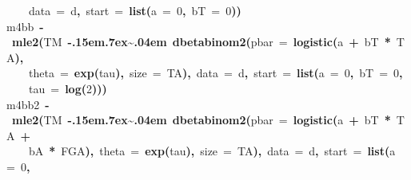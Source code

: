 \documentclass{article}
\makeatletter
\newcommand{\hlnumber}[1]{\textcolor[rgb]{0,0,0}{#1}}%
\newcommand{\hlfunctioncall}[1]{\textcolor[rgb]{.5,0,.33}{\textbf{#1}}}%
\newcommand{\hlkeyword}[1]{\textbf{#1}}%
\newcommand{\hlargument}[1]{\textcolor[rgb]{.69,.25,.02}{#1}}%
\newcommand{\hlassignement}[1]{\textbf{#1}}%
\newcommand{\hlsymbol}[1]{#1}%
\def\urltilda{\kern -.15em\lower .7ex\hbox{\~{}}\kern .04em}%
\newcommand{\hlstd}[1]{\textcolor[rgb]{0,0,0}{#1}}%
\newenvironment{kframe}{%
 \def\FrameCommand##1{\hskip\@totalleftmargin \hskip-\fboxsep
 \colorbox{shadecolor}{##1}\hskip-\fboxsep
     \hskip-\linewidth \hskip-\@totalleftmargin \hskip\columnwidth}%
 \MakeFramed {\advance\hsize-\width
   \@totalleftmargin\z@ \linewidth\hsize
   \@setminipage}}%
 {\par\unskip\endMakeFramed}
\newenvironment{knitrout}{}{} %
\makeatother
\begin{document}
\begin{knitrout}
{\begin{kframe}
\begin{flushleft}
\hlstd{}{\ }{\ }{\ }{\ }\hlargument{data}{\ }\hlargument{=}{\ }\hlsymbol{d}\hlkeyword{,}{\ }\hlargument{start}{\ }\hlargument{=}{\ }\hlfunctioncall{list}\hlkeyword{(}\hlargument{a}{\ }\hlargument{=}{\ }\hlnumber{0}\hlkeyword{,}{\ }\hlargument{bT}{\ }\hlargument{=}{\ }\hlnumber{0}\hlkeyword{)}\hlkeyword{)}\hspace*{\fill}\\
\hlstd{}\hlsymbol{m4bb}{\ }\hlassignement{\usebox{\hlnormalsizeboxlessthan}-}{\ }\hlfunctioncall{mle2}\hlkeyword{(}\hlsymbol{TM}{\ }\hlkeyword{\urltilda{}}{\ }\hlfunctioncall{dbetabinom2}\hlkeyword{(}\hlargument{pbar}{\ }\hlargument{=}{\ }\hlfunctioncall{logistic}\hlkeyword{(}\hlsymbol{a}{\ }\hlkeyword{+}{\ }\hlsymbol{bT}{\ }\hlkeyword{*}{\ }\hlsymbol{TA}\hlkeyword{)}\hlkeyword{,}\hspace*{\fill}\\
\hlstd{}{\ }{\ }{\ }{\ }\hlargument{theta}{\ }\hlargument{=}{\ }\hlfunctioncall{exp}\hlkeyword{(}\hlsymbol{tau}\hlkeyword{)}\hlkeyword{,}{\ }\hlargument{size}{\ }\hlargument{=}{\ }\hlsymbol{TA}\hlkeyword{)}\hlkeyword{,}{\ }\hlargument{data}{\ }\hlargument{=}{\ }\hlsymbol{d}\hlkeyword{,}{\ }\hlargument{start}{\ }\hlargument{=}{\ }\hlfunctioncall{list}\hlkeyword{(}\hlargument{a}{\ }\hlargument{=}{\ }\hlnumber{0}\hlkeyword{,}{\ }\hlargument{bT}{\ }\hlargument{=}{\ }\hlnumber{0}\hlkeyword{,}\hspace*{\fill}\\
\hlstd{}{\ }{\ }{\ }{\ }\hlargument{tau}{\ }\hlargument{=}{\ }\hlfunctioncall{log}\hlkeyword{(}\hlnumber{2}\hlkeyword{)}\hlkeyword{)}\hlkeyword{)}\hspace*{\fill}\\
\hlstd{}\hlsymbol{m4bb2}{\ }\hlassignement{\usebox{\hlnormalsizeboxlessthan}-}{\ }\hlfunctioncall{mle2}\hlkeyword{(}\hlsymbol{TM}{\ }\hlkeyword{\urltilda{}}{\ }\hlfunctioncall{dbetabinom2}\hlkeyword{(}\hlargument{pbar}{\ }\hlargument{=}{\ }\hlfunctioncall{logistic}\hlkeyword{(}\hlsymbol{a}{\ }\hlkeyword{+}{\ }\hlsymbol{bT}{\ }\hlkeyword{*}{\ }\hlsymbol{TA}{\ }\hlkeyword{+}\hspace*{\fill}\\
\hlstd{}{\ }{\ }{\ }{\ }\hlsymbol{bA}{\ }\hlkeyword{*}{\ }\hlsymbol{FGA}\hlkeyword{)}\hlkeyword{,}{\ }\hlargument{theta}{\ }\hlargument{=}{\ }\hlfunctioncall{exp}\hlkeyword{(}\hlsymbol{tau}\hlkeyword{)}\hlkeyword{,}{\ }\hlargument{size}{\ }\hlargument{=}{\ }\hlsymbol{TA}\hlkeyword{)}\hlkeyword{,}{\ }\hlargument{data}{\ }\hlargument{=}{\ }\hlsymbol{d}\hlkeyword{,}{\ }\hlargument{start}{\ }\hlargument{=}{\ }\hlfunctioncall{list}\hlkeyword{(}\hlargument{a}{\ }\hlargument{=}{\ }\hlnumber{0}\hlkeyword{,}\hspace*{\fill}\\

\end{flushleft}
\end{kframe}}
\end{knitrout}
\end{document}
